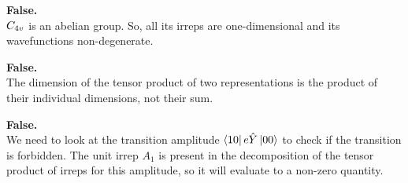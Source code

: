\begin{alphaparts}

    \questionpart \textbf{False.}\\
    $C_{4v}$ is an abelian group. So, all its irreps are one-dimensional
    and its wavefunctions non-degenerate.

    \questionpart \textbf{False.}\\
    The dimension of the tensor product of two representations is the product
    of their individual dimensions, not their sum.

    \questionpart \textbf{False.}\\
    We need to look at the transition amplitude $\bra{10} e\hat Y \ket{00}$ to check if the 
    transition is forbidden. The unit irrep $A_1$ is present in the decomposition of the 
    tensor product of irreps for this amplitude, so it will evaluate to a non-zero quantity.

\end{alphaparts}